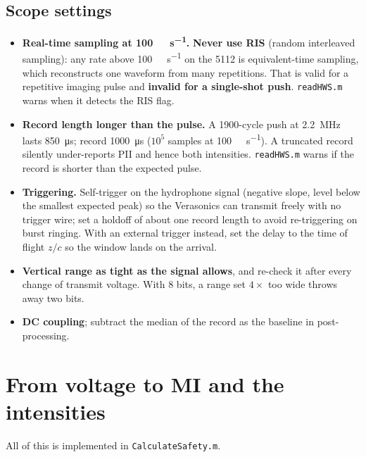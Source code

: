 \documentclass[11pt,a4paper]{article}
\newcommand{\caveat}[1]{\textcolor{orange!75!black}{\textbf{#1}}}
\begin{document}
\subsection{Scope settings}\label{sec:scopesettings}
\begin{itemize}
  \item \textbf{Real-time sampling at \SI{100}{\mega\sample\per\second}.} \caveat{Never use RIS}
    (random interleaved sampling): any rate above \SI{100}{\mega\sample\per\second} on the 5112 is
    equivalent-time sampling, which reconstructs one waveform from many repetitions. That is valid
    for a repetitive imaging pulse and \textbf{invalid for a single-shot push}. \texttt{readHWS.m}
    warns when it detects the RIS flag.
  \item \textbf{Record length longer than the pulse.} A 1900-cycle push at \SI{2.2}{\mega\hertz}
    lasts \SI{850}{\micro\second}; record \SI{1000}{\micro\second} ($10^5$ samples at
    \SI{100}{\mega\sample\per\second}). A truncated record silently under-reports PII and hence both
    intensities. \texttt{readHWS.m} warns if the record is shorter than the expected pulse.
  \item \textbf{Triggering.} Self-trigger on the hydrophone signal (negative slope, level below the
    smallest expected peak) so the Verasonics can transmit freely with no trigger wire; set a holdoff
    of about one record length to avoid re-triggering on burst ringing. With an external trigger
    instead, set the delay to the time of flight $z/c$ so the window lands on the arrival.
  \item \textbf{Vertical range as tight as the signal allows}, and re-check it after every change of
    transmit voltage. With 8 bits, a range set $4\times$ too wide throws away two bits.
  \item \textbf{DC coupling}; subtract the median of the record as the baseline in post-processing.
\end{itemize}

\section{From voltage to MI and the intensities}\label{sec:conversion}
All of this is implemented in \texttt{CalculateSafety.m}.
\end{document}
